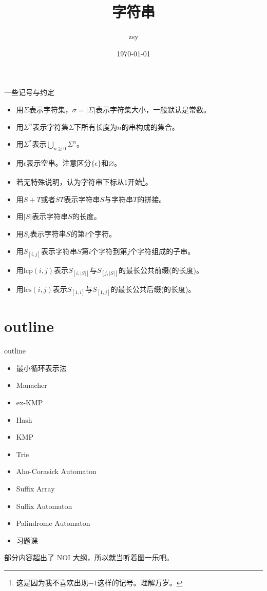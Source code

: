 \documentclass{beamer}
\title{字符串}
\date{\today}
\author{zsy}
\theoremstyle{compact}
\def\ge{\geqslant}
\def\lcp{\textrm{lcp}}
\def\lcs{\textrm{lcs}}
\begin{document}
\small
	
	\begin{frame}
	\titlepage
		\begin{center}
		
		\end{center}
	\end{frame}

\begin{frame}{一些记号与约定}
\begin{itemize}
	\item 用$\Sigma$表示字符集，$\sigma = |\Sigma|$表示字符集大小，一般默认是常数。
	\item 用$\Sigma^n$表示字符集$\Sigma$下所有长度为$n$的串构成的集合。
	\item 用$\Sigma^*$表示$\bigcup_{n \ge 0}\Sigma^n$。
	\item 用$\epsilon$表示空串。注意区分$\{\epsilon\}$和$\varnothing$。
	\item 若无特殊说明，认为字符串下标从$1$开始\footnote{\tiny 这是因为我不喜欢出现$-1$这样的记号。理解万岁。}。
	\item 用$S+T$或者$ST$表示字符串$S$与字符串$T$的拼接。
	\item 用$|S|$表示字符串$S$的长度。
	\item 用$S_i$表示字符串$S$的第$i$个字符。
	\item 用$S_{[i, j]}$表示字符串$S$第$i$个字符到第$j$个字符组成的子串。
	\item 用$\lcp(i,j)$表示$S_{[i, |S|]}$与$S_{[j, |S|]}$的最长公共前缀(的长度)。
	\item 用$\lcs(i,j)$表示$S_{[1, i]}$与$S_{[1, j]}$的最长公共后缀(的长度)。
\end{itemize}
\end{frame}

\section{outline}
\begin{frame}{outline}
\begin{itemize}
	\item 最小循环表示法
	\item Manacher
	\item ex-KMP
	\item Hash
	\item KMP
	\item Trie
	\item Aho-Corasick Automaton
	\item Suffix Array
	\item Suffix Automaton
	\item Palindrome Automaton
	\item 习题课
\end{itemize}

\tiny{部分内容超出了 NOI 大纲，所以就当听着图一乐吧。}

\end{frame}
\end{document}
